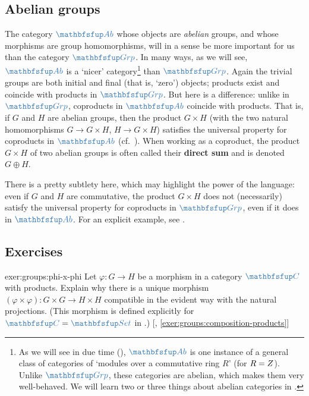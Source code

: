 \subsection{Abelian groups}%
\label{subsec:groups:abelian-groups}
The category $\categ{Ab}$ whose objects are \emph{abelian} groups, and
whose morphisms are group homomorphisms, will in a sense be more
important for us than the category $\categ{Grp}$. In many ways, as we
will see, $\categ{Ab}$ is a `nicer' category\footnote{As we will see
  in due time (), $\categ{Ab}$ is one
  instance of a general class of categories of `modules over a
  commutative ring $R$' (for $R = Z$). Unlike $\categ{Grp}$, these
  categories are abelian, which makes them very well-behaved. We will
  learn two or three things about abelian categories in
  .} than $\categ{Grp}$.  Again the trivial groups
are both initial and final (that is, `zero') objects; products exist
and coincide with products in $\categ{Grp}$. But here is a difference:
unlike in $\categ{Grp}$, coproducts in $\categ{Ab}$ coincide with
products. That is, if $G$ and $H$ are abelian groups, then the product
$G \times H$ (with the two natural homomorphisms $G \to G \times H$,
$H \to G \times H$) satisfies the universal property for coproducts in
$\categ{Ab}$ (cf.\ ). When working as a
coproduct, the product $G \times H$ of two abelian groups is often
called their \textbf{direct sum} and is denoted $G \oplus H$.

There is a pretty subtlety here, which may highlight the power of the
language: even if $G$ and $H$ are commutative, the product
$G \times H$ does not (necessarily) satisfy the universal property for
coproducts in $\categ{Grp}$, even if it does in $\categ{Ab}$. For an
explicit example, see .

\subsection*{Exercises}

\begin{exer}{\exerused}{exer:groups:phi-x-phi}
  Let $\varphi : G \to H$ be a morphism in a category $\categ{C}$ with
  products. Explain why there is a unique morphism
  $(\varphi \times \varphi) : G \times G \to H \times H$ compatible in
  the evident way with the natural projections. (This morphism is
  defined explicitly for $\categ{C} = \categ{Set}$ in
  .)
  [,
  \ref{exer:groups:composition-products}]
\end{exer}

